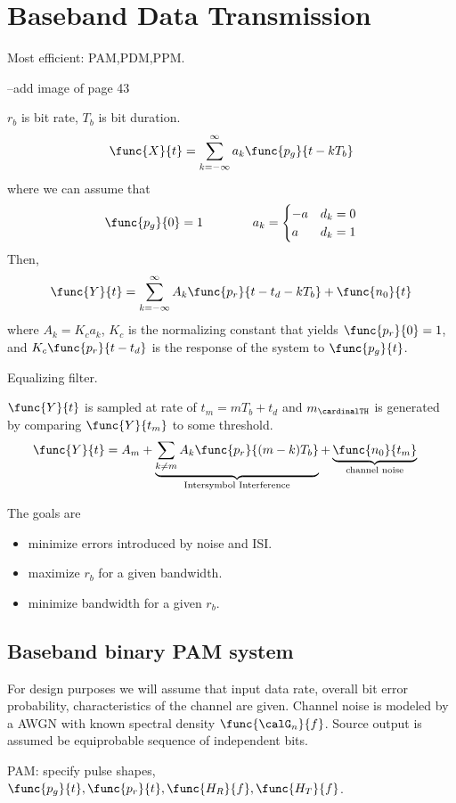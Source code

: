 \chapter{Baseband Data Transmission}
\begin{remark}
    Most efficient: PAM,PDM,PPM.
\end{remark}

--add image of page 43

\(r_b\) is bit rate, \(T_b\) is bit duration.
\begin{equation*}
    \func{X}{t} = \sum_{k = -\infty}^{\infty} a_k \func{p_g}{t - kT_b}
\end{equation*}
where we can assume that 
\begin{equation*}
    \func{p_g}{0} = 1 \qquad \qquad a_k = \begin{cases}
        -a & d_k = 0\\
        a & d_k = 1
    \end{cases}
\end{equation*}
Then, 
\begin{equation*}
    \func{Y}{t} = \sum_{k = -\infty}^{\infty} A_k \func{p_r}{t - t_d - kT_b} + \func{n_0}{t}
\end{equation*}
where \(A_k = K_c a_k\), \(K_c\) is the normalizing constant that yields \(\func{p_r}{0} = 1\), and \(K_c\func{p_r}{t-t_d}\) is the response of the system to \(\func{p_g}{t}\).

\begin{remark}
    Equalizing filter.
\end{remark}

\(\func{Y}{t}\) is sampled at rate of \(t_m = mT_b + t_d\) and \(m_{\cardinalTH}\) is generated by comparing \(\func{Y}{t_m}\) to some threshold.
\begin{align*}
    \func{Y}{t} &= A_m + \underbrace{\sum_{k \neq m} A_k \func{p_r}{(m -k )T_b}}_{\text{Intersymbol Interference}} + \underbrace{\func{n_0}{t_m}}_{\text{channel noise}}
\end{align*}

The goals are 
\begin{itemize}
    \item minimize errors introduced by noise and ISI.
    \item maximize \(r_b\) for a given bandwidth.
    \item minimize bandwidth for a given \(r_b\).
\end{itemize}

\section{Baseband binary PAM system}
For design purposes we will assume that input data rate, overall bit error probability, characteristics of the channel are given. Channel noise is modeled by a AWGN with known spectral density \(\func{\calG_n}{f}\). Source output is assumed be equiprobable sequence of independent bits.
\begin{remark}
    PAM: specify pulse shapes, \(\func{p_g}{t}, \func{p_r}{t},\func{H_R}{f},\func{H_T}{f}\).
\end{remark}

